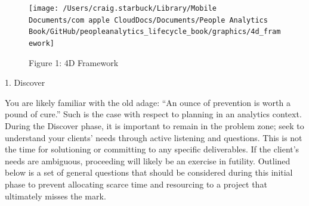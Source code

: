 \documentclass[]{book}
\begin{document}
\begin{figure}
\texttt{[image: /Users/craig.starbuck/Library/Mobile Documents/com~apple~CloudDocs/Documents/People Analytics Book/GitHub/peopleanalytics\_lifecycle\_book/graphics/4d\_framework]} \caption{Figure 1: 4D Framework}\label{fig:unnamed-chunk-48}
\end{figure}

1. Discover

You are likely familiar with the old adage: ``An ounce of prevention is worth a pound of cure.'' Such is the case with respect to planning in an analytics context. During the Discover phase, it is important to remain in the problem zone; seek to understand your clients' needs through active listening and questions. This is not the time for solutioning or committing to any specific deliverables. If the client's needs are ambiguous, proceeding will likely be an exercise in futility. Outlined below is a set of general questions that should be considered during this initial phase to prevent allocating scarce time and resourcing to a project that ultimately misses the mark.
\end{document}
